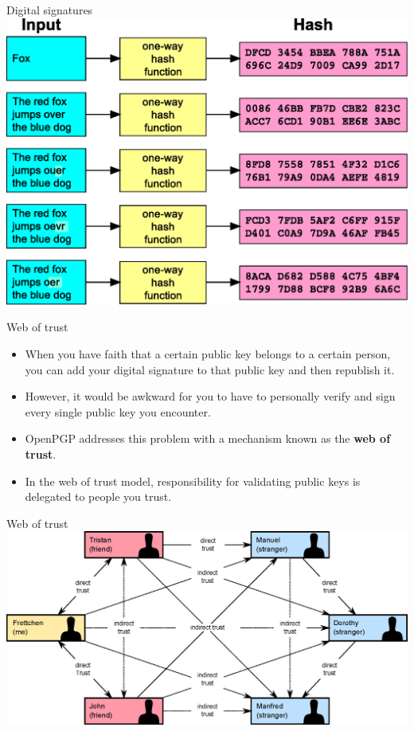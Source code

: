 \documentclass[
mode=present,
paper=smartboard,
size=20pt,
]{powerdot}
\begin{document}
\begin{slide}[toc=]{Digital signatures}
\centering\includegraphics[width=0.8\linewidth]{images/Cryptographic_Hash_Function.eps}
\end{slide}

\begin{slide}{Web of trust}
  \begin{itemize}
  \item When you have faith that a certain public key belongs to a
    certain person, you can add your digital signature to that public
    key and then republish it.
  \item However, it would be awkward for you to have to personally
    verify and sign every single public key you encounter.
  \item OpenPGP addresses this problem with a mechanism
    known as the \textbf{web of trust}.
  \item In the web of trust model, responsibility for validating
    public keys is delegated to people you trust.
  \end{itemize}
\end{slide}

\begin{slide}[toc=]{Web of trust}
\centering\includegraphics[width=\linewidth]{images/Web_of_Trust.eps}
\end{slide}
\end{document}
